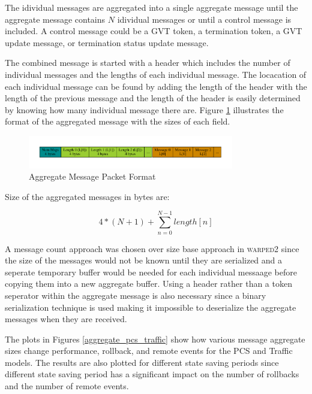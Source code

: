 \documentclass[11pt]{book}
\begin{document}
The idividual messages are aggregated into a single aggregate message until the aggregate message
contains $N$ idividual messages or until a control message is included.  A control message could be
a GVT token, a termination token, a GVT update message, or termination status update message.

The combined message is started with a header which includes the number of individual messages
and the lengths of each individual message.  The locacation of each individual message can be
found by adding the length of the header with the length of the previous message and the length
of the header is easily determined by knowing how many individual message there are.  Figure
\ref{aggregate_format} illustrates the format of the aggregated message with the sizes of each
field.

\begin{figure}
    \centering
    \includegraphics[width=0.8\textwidth,quiet]{figs/graphviz/aggregation_format.pdf}
    \caption{Aggregate Message Packet Format}\label{aggregate_format}
\end{figure}

Size of the aggregated messages in bytes are:

$$ 4 * (N + 1) + \sum_{n=0}^{N-1} length[n] $$

A message count approach was chosen over size base approach in \textsc{warped2} since the
size of the messages would not be known until they are serialized and a seperate temporary buffer
would be needed for each individual messaage before copying them into a new aggregate buffer.
Using a header rather than a token seperator within the aggregate message is also necessary
since a binary serialization technique is used making it impossible to deserialize the aggregate
messages when they are received.

The plots in Figures \ref{aggregate_pcs_traffic} show how various message aggregate sizes change
performance, rollback, and remote events for the PCS and Traffic models.  The results are also
plotted for different state saving periods since different state saving period has a significant
impact on the number of rollbacks and the number of remote events.
\end{document}

